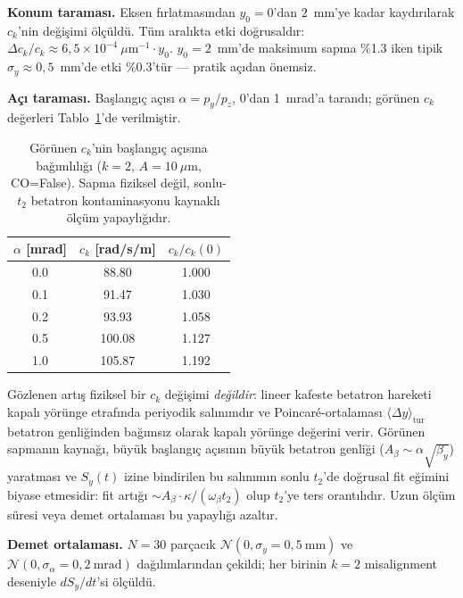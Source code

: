 \documentclass[preprint,12pt]{elsarticle}
\begin{document}
\textbf{Konum taraması.}
Eksen fırlatmasından $y_0=0$'dan $2$~mm'ye kadar kaydırılarak $c_k$'nin
değişimi ölçüldü.  Tüm aralıkta etki doğrusaldır: $\Delta c_k/c_k \approx
6{,}5\times10^{-4}\ \mu\text{m}^{-1}\cdot y_0$. $y_0=2$~mm'de maksimum
sapma \%1.3 iken tipik $\sigma_y\approx0{,}5$~mm'de etki \%0.3'tür —
pratik açıdan önemsiz.

\textbf{Açı taraması.}
Başlangıç açısı $\alpha=p_y/p_z$, 0'dan 1~mrad'a tarandı; görünen $c_k$
değerleri Tablo~\ref{tab:ck-launch}'de verilmiştir.

\begin{table}[h]
\centering
\caption{Görünen $c_k$'nin başlangıç açısına bağımlılığı ($k=2$,
$A=10~\mu$m, CO=False). Sapma fiziksel değil, sonlu-$t_2$ betatron
kontaminasyonu kaynaklı ölçüm yapaylığıdır.}
\label{tab:ck-launch}
\begin{tabular}{ccc}
\toprule
$\alpha$ [mrad] & $c_k$ [rad/s/m] & $c_k/c_k(0)$ \\
\midrule
0.0 & 88.80 & 1.000 \\
0.1 & 91.47 & 1.030 \\
0.2 & 93.93 & 1.058 \\
0.5 & 100.08 & 1.127 \\
1.0 & 105.87 & 1.192 \\
\bottomrule
\end{tabular}
\end{table}

Gözlenen artış fiziksel bir $c_k$ değişimi \emph{değildir}: lineer kafeste
betatron hareketi kapalı yörünge etrafında periyodik salınımdır ve
Poincaré-ortalaması $\langle\Delta y\rangle_\mathrm{tur}$ betatron
genliğinden bağımsız olarak kapalı yörünge değerini verir. Görünen sapmanın
kaynağı, büyük başlangıç açısının büyük betatron genliği ($A_\beta\sim
\alpha\sqrt{\beta_y}$) yaratması ve $S_y(t)$ izine bindirilen bu
salınımın sonlu $t_2$'de doğrusal fit eğimini biyase etmesidir: fit
artığı $\sim A_\beta\cdot\kappa/(\omega_\beta t_2)$ olup $t_2$'ye ters
orantılıdır. Uzun ölçüm süresi veya demet ortalaması bu yapaylığı
azaltır.

\textbf{Demet ortalaması.}
$N=30$ parçacık $\mathcal{N}(0,\sigma_y{=}0{,}5~\text{mm})$ ve
$\mathcal{N}(0,\sigma_\alpha{=}0{,}2~\text{mrad})$ dağılımlarından
çekildi; her birinin $k=2$ misalignment deseniyle $dS_y/dt$'si ölçüldü.
\end{document}
